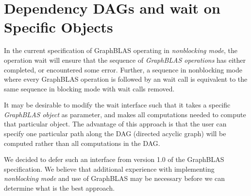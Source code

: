 \section{Dependency DAGs and {\sf wait} on Specific Objects}
\label{Sec:DAG}

In the current specification of GraphBLAS operating in \emph{nonblocking mode}, the 
operation {\sf wait} will ensure that the sequence of \emph{GraphBLAS operations} 
has either completed, or encountered some error. Further, a sequence in nonblocking mode where every GraphBLAS operation is followed by an {\sf wait} call is 
equivalent to the same sequence in blocking mode with {\sf wait} calls removed.

It may be desirable to modify the {\sf wait} interface such that it takes a specific \emph{GraphBLAS object} as parameter, and makes all computations needed to compute that particular object. The advantage of this approach is that the user can specify one particular path along the DAG (directed acyclic graph) will be computed rather than all computations in the DAG.

We decided to defer such an interface from version 1.0 of the GraphBLAS specification. We believe that additional experience with implementing \emph{nonblocking mode} and use of GraphBLAS may be necessary before we can determine what is the best approach.


